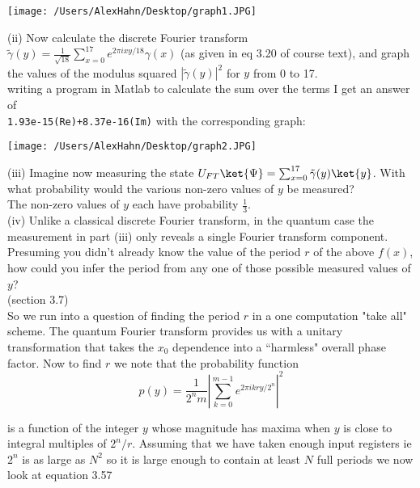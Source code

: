 \begin{center}
\texttt{[image: /Users/AlexHahn/Desktop/graph1.JPG]}
\end{center}


(ii) Now calculate the discrete Fourier transform
$\tilde\gamma(y)=\frac{1}{\sqrt{18}}\sum^{17}_{x=0}e^{2\pi i
xy/18}\gamma(x)$ (as given in eq 3.20 of course text), and graph the values of
the modulus squared $|\tilde\gamma(y)|^2$ for $y$ from 0 to 17.\\

writing a program in Matlab to calculate the sum over the terms I get an
answer of\\
\texttt{1.93e-15(Re)+8.37e-16(Im)} with the
corresponding graph:

\begin{center}
\texttt{[image: /Users/AlexHahn/Desktop/graph2.JPG]}
\end{center}

(iii) Imagine now measuring the state
$U_{FT}\ket{\Psi}=\sum^{17}_{x=0}\tilde\gamma(y)\ket{y}$. With what
probability would the various non-zero values of $y$ be measured?\\

The non-zero values of $y$ each have probability $\frac{1}{3}$.\\

(iv) Unlike a classical discrete Fourier transform, in the quantum case the
measurement in part (iii) only reveals a single Fourier transform component.
Presuming you didn't already know the value of the period $r$ of the above $f(x)$, how could you infer the period from any one of those possible measured values of $y$?\\

(section 3.7)\\

So we run into a question of finding the period $r$ in a one computation
"take all" scheme. The quantum Fourier transform provides us with a unitary
transformation that takes the $x_0$ dependence into a ``harmless" overall
phase factor. Now to find $r$ we note that the probability function
$$p(y)=\frac{1}{2^nm}\left|\sum^{m-1}_{k=0}e^{2\pi ikry/2^n}\right|^2$$

is a function of the integer $y$ whose magnitude has maxima when $y$ is
close to integral multiples of $2^n/r$. Assuming that we have taken enough
input registers ie $2^n$ is as large as $N^2$ so it is large enough to
contain at least $N$ full periods we now look at equation 3.57

